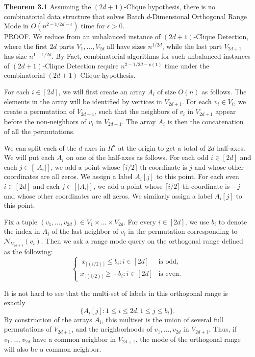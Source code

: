 \documentclass[preprint,10pt]{elsarticle}
\begin{document}
\begin{multicols}{2}
    \textbf{Theorem 3.1} Assuming the $(2d+1)$-Clique hypothesis, there is no combinatorial data structure that solves Batch $d$-Dimensional  Orthogonal Range Mode in $O(n^{2-1/2d-\epsilon})$  time for $\epsilon > 0$.\\
    PROOF. We reduce from an unbalanced instance of $(2d+1)$-Clique Detection, where the first $2d$ parts $V_1, ..., V_{2d}$ all have sizes $n^{1/2d}$, while the last part $V_{2d+1}$ has size $n^{1-1/2d}$. By Fact, combinatorial algorithms for such unbalanced instances of $(2d+1)$-Clique Detection require $n^{2-1/2d-o(1)}$ time under the combinatorial $(2d+1)$-Clique hypothesis. 


For each $i \in [2d]$, we will first create an array $A_i$ of size $O(n)$ as follows. The elements in the array will be identified by vertices in $V_{2d+1}$. For each $v_i \in V_i$, we create a permutation of $V_{2d+1}$, such that the neighbors of $v_i$ in $V_{2d+1}$ appear before the non-neighbors of $v_i$ in $V_{2d+1}$. The array $A_i$ is then the concatenation of all the permutations. 

We can split each of the $d$ axes in $R^d$ at the origin to get a total of $2d$ half-axes. We will put each $A_i$ on one of the half-axes as follows. For each odd $i \in [2d]$ and each $j \in [|A_i|]$, we add a point whose $\lceil i/2 \rceil$-th coordinate is $j$ and whose other coordinates are all zeros. We assign a label $A_i[j]$ to this point. For each even $i \in [2d]$ and each $j \in [|A_i|]$, we add a point whose $\lceil i/2 \rceil$-th coordinate is $-j$ and whose other coordinates are all zeros. We similarly assign a label $A_i[j]$ to this point. 

Fix a tuple $(v_1, ..., v_{2d}) \in V_1 \times ... \times V_{2d}$. For every $i \in [2d]$, we use $b_i$ to denote the index in $A_i$ of the last neighbor of $v_i$ in the permutation corresponding to $\mathcal{N}_{V_{2d+1}}(v_i)$. Then we ask a range mode query on the orthogonal range defined as the following:\\
\begin{equation}
    \begin{cases}
       \ x_{\lceil(i/2)\rceil} \leq b_i :i\in [2d] & \text{is odd},\\ 
       x_{\lceil(i/2)\rceil} \geq -b_i  :i\in [2d] & \text{is even.} \nonumber 
    \end{cases}
\end{equation}


It is not hard to see that the multi-set of labels in this orthogonal range is exactly 
$$\{A_i[j]: 1 \leq i \leq 2d, 1 \leq j \leq b_i\}.$$
By construction of the arrays $A_i$, this multiset is the union of several full permutations of $V_{2d+1}$, and the neighborhoods of $v_1, ..., v_{2d}$ in $V_{2d+1}$. Thus, if $v_1, ..., v_{2d}$ have a common neighbor in $V_{2d+1}$, the  mode of the orthogonal range will also be a common neighbor. 


\end{multicols}
\end{document}
